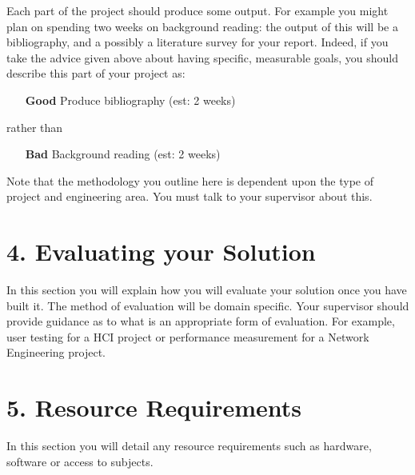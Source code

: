 \documentclass[11pt, a4paper, twoside, openright]{report}
\begin{document}
Each part of the project should produce some output. For example you might plan on spending two weeks on background reading: the output of this will be a bibliography, and a possibly a literature survey for your report. Indeed, if you take the advice given above about having specific, measurable goals, you should describe this part of your project as:

\begin{itemize}
  \item[\bf Good] Produce bibliography (est: 2 weeks)
\end{itemize}
rather than
\begin{itemize}
  \item[\bf Bad] Background reading (est: 2 weeks)
\end{itemize}

Note that the methodology you outline here is dependent upon the type of project and engineering area. You must talk to your supervisor about this.

\section*{4. Evaluating your Solution}

In this section you will explain how you will evaluate your solution once you have built it. The method of evaluation will be domain specific. Your supervisor should provide guidance as to what is an appropriate form of evaluation. For example, user testing for a HCI project or performance measurement for a Network Engineering project. 

\section*{5. Resource Requirements}

In this section you will detail any resource requirements such as hardware, software or access to subjects.

\backmatter

\nocite{*}


\end{document}
